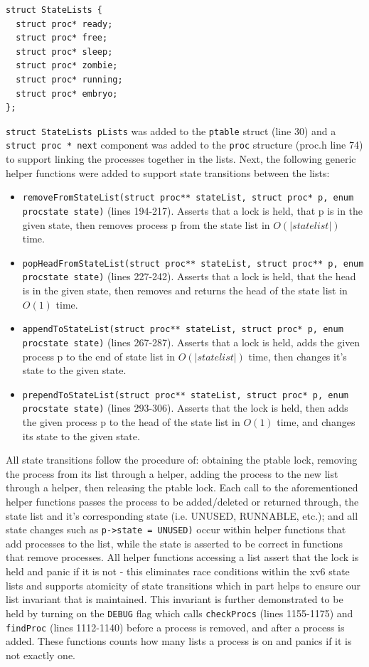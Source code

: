 \documentclass[11pt,letterpaper]{report}
\begin{document}
\begin{verbatim}
struct StateLists {
  struct proc* ready;
  struct proc* free;
  struct proc* sleep;
  struct proc* zombie;
  struct proc* running;
  struct proc* embryo;
};
\end{verbatim}
	{\tt struct StateLists pLists} was added to the {\tt ptable} struct (line 30) and a {\tt struct proc * next} component was added to the {\tt proc} structure (proc.h line 74) to support linking the processes together in the lists. 
	Next, the following generic helper functions were added to support state transitions between the lists:
		\begin{itemize}
			\item {\tt removeFromStateList(struct proc** stateList, struct proc* p, enum procstate state)} (lines 194-217). Asserts that a lock is held, that p is in the given state, then removes process p from the state list in $O(|statelist|)$ time.
			\item {\tt popHeadFromStateList(struct proc** stateList, struct proc** p, enum procstate state)} (lines 227-242). Asserts that a lock is held, that the head is in the given state, then removes and returns the head of the state list in $O(1)$ time. 
			\item {\tt appendToStateList(struct proc** stateList, struct proc* p, enum procstate state)} (lines 267-287). Asserts that a lock is held, adds the given process p to the end of state list in $O(|statelist|)$ time, then changes it's state to the given state.
			\item {\tt prependToStateList(struct proc** stateList, struct proc* p, enum procstate state)} (lines 293-306). Asserts that the lock is held, then adds the given process p to the head of the state list in $O(1)$ time, and changes its state to the given state.
		\end{itemize}
	
	All state transitions follow the procedure of: obtaining the ptable lock, removing the process from its list through a helper, adding the process to the new list through a helper, then releasing the ptable lock.
	Each call to the aforementioned helper functions passes the process to be added/deleted or returned through, the state list and it's corresponding state (i.e. UNUSED, RUNNABLE, etc.); and all state changes such as {\tt p->state = UNUSED)}
	occur within helper functions that add processes to the list, while the state is asserted to be correct in functions that remove processes. All helper functions accessing a list assert that the lock is held and panic if it is not - this eliminates race conditions 
	within the xv6 state lists and supports atomicity of state transitions which in part helps to ensure our list invariant that is maintained. This invariant is further demonstrated to be held by turning on the {\tt DEBUG} flag which calls {\tt checkProcs} (lines 1155-1175) and {\tt findProc} (lines 1112-1140) before a process is removed, and after a process is added. These functions counts how many lists a process is on and panics if it is not exactly one.
	
\end{document}

